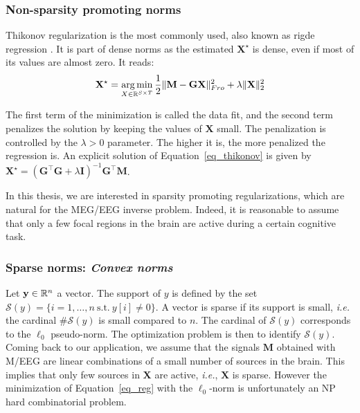 \subsubsection*{Non-sparsity promoting norms}
Thikonov regularization \cite{tikhonov1977solutions} is the most commonly used, also known as rigde regression \cite{hoerl1970ridge}. It is part of dense norms as the estimated $\mathbf{X}^\star$ is dense, even if most of its values are almost zero. It reads:
\begin{equation} \label{eq_thikonov}
	\mathbf{X}^\star = \mathop{\mathrm{arg}\,\mathrm{min}}_{X\in\mathbb{R}^{S\times T}}\frac{1}{2}\|\mathbf{M}-\mathbf{GX}\|_{Fro}^2 + \lambda\|\mathbf{X}\|_2^2
\end{equation}

The first term of the minimization is called the data fit, and the second term penalizes the solution by keeping the values of $\mathbf{X}$ small. The penalization is controlled by the $\lambda>0$ parameter. The higher it is, the more penalized the regression is. An explicit solution of Equation~\eqref{eq_thikonov} is given by $\mathbf{X}^\star = (\mathbf{G}^\top\mathbf{G}+\lambda\mathbf{I})^{-1}\mathbf{G}^\top\mathbf{M}$. 

In this thesis, we are interested in sparsity promoting regularizations, which are natural for the MEG/EEG inverse problem. Indeed, it is reasonable to assume that only a few focal regions in the brain are active during a certain cognitive task.

\subsubsection*{Sparse norms: \textit{Convex norms}}
Let $\mathbf{y}\in\mathbb{R}^n$ a vector. The support of $y$ is defined by the set $\mathcal{S}(y) = \{i=1,\dots ,n \mathrm{\ s.t.\ } y[i]\neq 0\}$.
A vector is sparse if its support is small, \textit{i.e.} the cardinal $\# \mathcal{S}(y)$ is small compared to $n$.
The cardinal of $\mathcal{S}(y)$ corresponds to the $\ell_0$ pseudo-norm. The optimization problem is then to identify $\mathcal{S}(y)$.\\

Coming back to our application, we assume that the signals $\mathbf{M}$ obtained with M/EEG are linear combinations of a small number of sources in the brain. This implies that only few sources in $\mathbf{X}$ are active, \textit{i.e.}, $\mathbf{X}$ is sparse. However the minimization of Equation~\eqref{eq_reg} with the $\ell_0$-norm is unfortunately an NP hard combinatorial problem.

